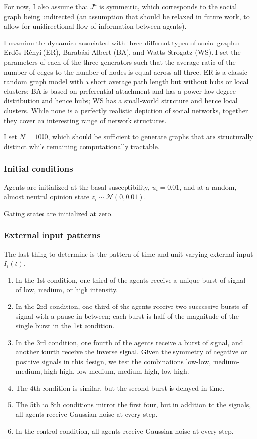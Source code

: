 \documentclass[]{article}
\begin{document}
For now, I also assume that $J^a$ is symmetric, which corresponds to the social graph being undirected (an assumption that should be relaxed in future work, to allow for unidirectional flow of information between agents).

I examine the dynamics associated with three different types of social graphs: Erdős-Rényi (ER), Barabási-Albert (BA), and Watts-Strogatz (WS). I set the parameters of each of the three generators such that the average ratio of the number of edges to the number of nodes is equal across all three. ER is a classic random graph model with a short average path length but without hubs or local clusters; BA is based on preferential attachment and has a power law degree distribution and hence hubs; WS has a small-world structure and hence local clusters. While none is a perfectly realistic depiction of social networks, together they cover an interesting range of network structures. 

I set $N = 1000$, which should be sufficient to generate graphs that are structurally distinct while remaining computationally tractable. 

\subsubsection{Initial conditions}
Agents are initialized at the basal susceptibility, $u_i = 0.01$, and at a random, almost neutral opinion state $z_i \sim \mathcal{N}(0, 0.01)$.

Gating states are initialized at zero.

\subsubsection{External input patterns}
The last thing to determine is the pattern of time and unit varying external input $I_i(t)$. 
\begin{enumerate}
	\item In the 1st condition, one third of the agents receive a unique burst of signal of low, medium, or high intensity. 
	\item In the 2nd condition, one third of the agents receive two successive bursts of signal with a pause in between; each burst is half of the magnitude of the single burst in the 1st condition.
	\item In the 3rd condition, one fourth of the agents receive a burst of signal, and another fourth receive the inverse signal. Given the symmetry of negative or positive signals in this design, we test the combinations low-low, medium-medium, high-high, low-medium, medium-high, low-high. 
	\item The 4th condition is similar, but the second burst is delayed in time.
	\item The 5th to 8th conditions mirror the first four, but in addition to the signals, all agents receive Gaussian noise at every step.
	\item In the control condition, all agents receive Gaussian noise at every step.
\end{enumerate}
\end{document}
